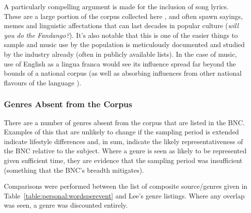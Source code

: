 A particularly compelling argument is made for the inclusion of song lyrics.  These are a large portion of the corpus collected here , and often spawn sayings, memes and linguistic affectations that can last decades in popular culture (\textit{will you do the Fandango?}).  It's also notable that this is one of the easier things to sample and music use by the population is meticulously documented and studied by the industry already (often in publicly available lists).  In the case of music, use of English as a lingua franca would see its influence spread far beyond the bounds of a national corpus (as well as absorbing influences from other national flavours of the language%
).









\subsubsection{Genres Absent from the Corpus}
There are a number of genres absent from the corpus that are listed in the BNC.  Examples of this that are unlikely to change if the sampling period is extended indicate lifestyle differences and, in sum, indicate the likely representativeness of the BNC relative to the subject.  Where a genre is seen as likely to be represented given sufficient time, they are evidence that the sampling period was insufficient (something that the BNC's breadth mitigates).

Comparisons were performed between the list of composite source/genres given in Table~\ref{table:personal:wordsperevent} and Lee's genre listings.  Where any overlap was seen, a genre was discounted entirely.



